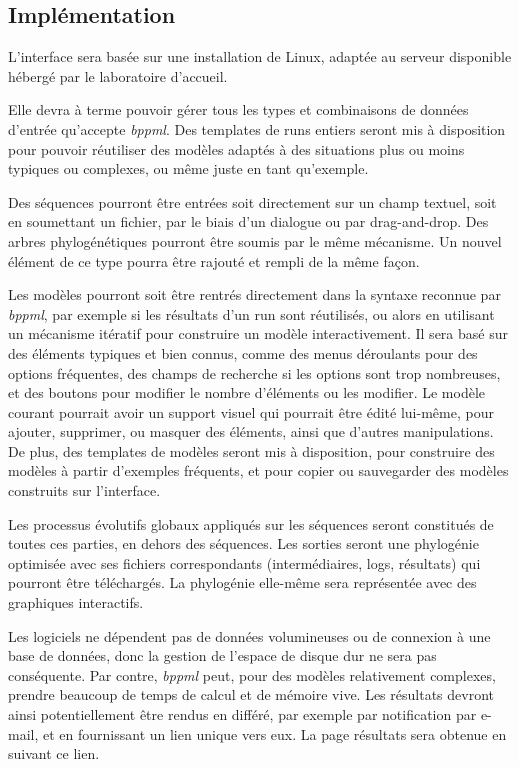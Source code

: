 \subsection{Implémentation}

L'interface sera basée sur une installation de Linux,
adaptée au serveur disponible hébergé par le laboratoire d'accueil.

Elle devra à terme pouvoir gérer tous les types
et combinaisons de données d'entrée qu'accepte \textit{bppml}.
Des templates de runs entiers seront mis à disposition
pour pouvoir réutiliser des modèles adaptés à des situations
plus ou moins typiques ou complexes,
ou même juste en tant qu'exemple.

Des séquences pourront être entrées soit directement sur un champ textuel,
soit en soumettant un fichier,
par le biais d'un dialogue ou par drag-and-drop.
Des arbres phylogénétiques pourront être soumis par le même mécanisme.
Un nouvel élément de ce type pourra être rajouté et rempli de la même façon.

Les modèles pourront
soit être rentrés directement dans la syntaxe reconnue par \textit{bppml},
par exemple si les résultats d'un run sont réutilisés,
ou alors en utilisant un mécanisme itératif pour construire un modèle interactivement.
Il sera basé sur des éléments typiques et bien connus,
comme des menus déroulants pour des options fréquentes,
des champs de recherche si les options sont trop nombreuses,
et des boutons pour modifier le nombre d'éléments ou les modifier.
Le modèle courant pourrait avoir un support visuel
qui pourrait être édité lui-même,
pour ajouter, supprimer, ou masquer des éléments,
ainsi que d'autres manipulations.
De plus, des templates de modèles seront mis à disposition,
pour construire des modèles à partir d'exemples fréquents,
et pour copier ou sauvegarder des modèles construits sur l'interface.

Les processus évolutifs globaux appliqués sur les séquences
seront constitués de toutes ces parties, en dehors des séquences.
Les sorties seront une phylogénie optimisée
avec ses fichiers correspondants
(intermédiaires, logs, résultats)
qui pourront être téléchargés.
La phylogénie elle-même sera représentée avec des graphiques interactifs.

Les logiciels ne dépendent pas de données volumineuses
ou de connexion à une base de données,
donc la gestion de l'espace de disque dur ne sera pas conséquente.
Par contre, \textit{bppml} peut,
pour des modèles relativement complexes,
prendre beaucoup de temps de calcul et de mémoire vive.
Les résultats devront ainsi potentiellement
être rendus en différé,
par exemple par notification par e-mail,
et en fournissant un lien unique vers eux.
La page résultats sera obtenue en suivant ce lien.

